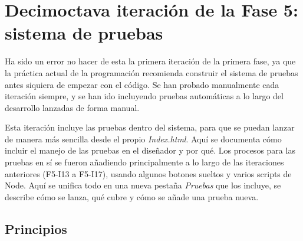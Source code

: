 \section{Decimoctava iteración de la Fase 5: sistema de pruebas}
\label{sec:F5I18}

Ha sido un error no hacer de esta la primera iteración de la primera fase, ya que la práctica actual de la programación recomienda construir el sistema de pruebas antes siquiera de empezar con el código. Se han probado manualmente cada iteración siempre, y se han ido incluyendo pruebas automáticas a lo largo del desarrollo lanzadas de forma manual.

Esta iteración incluye las pruebas dentro del sistema, para que se puedan lanzar de manera más sencilla desde el propio \emph{Index.html}. Aquí se documenta cómo incluir el manejo de las pruebas en el diseñador y por qué. Los procesos para las pruebas en sí se fueron añadiendo principalmente a lo largo de las iteraciones anteriores (F5-I13 a F5-I17), usando algunos botones sueltos y varios scripts de Node. Aquí se unifica todo en una nueva pestaña \emph{Pruebas} que los incluye, se describe cómo se lanza, qué cubre y cómo se añade una prueba nueva.

\subsection{Principios}
\label{sec:F5I18Principios}

